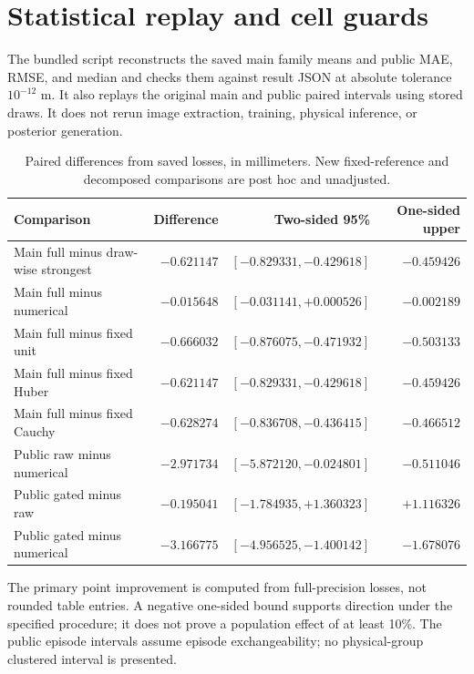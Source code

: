 \documentclass[11pt]{article}
\begin{document}
\section{Statistical replay and cell guards}
The bundled script reconstructs the saved main family means and public MAE, RMSE, and median and checks them against result JSON at absolute tolerance $10^{-12}$ m. It also replays the original main and public paired intervals using stored draws. It does not rerun image extraction, training, physical inference, or posterior generation.
\begin{table}[h]\centering\small
\caption{Paired differences from saved losses, in millimeters. New fixed-reference and decomposed comparisons are post hoc and unadjusted.}
\begin{tabular}{lrrr}\toprule Comparison & Difference & Two-sided 95\% & One-sided upper\\\midrule
Main full minus draw-wise strongest & $-0.621147$ & $[-0.829331,-0.429618]$ & $-0.459426$\\
Main full minus numerical & $-0.015648$ & $[-0.031141,+0.000526]$ & $-0.002189$\\
Main full minus fixed unit & $-0.666032$ & $[-0.876075,-0.471932]$ & $-0.503133$\\
Main full minus fixed Huber & $-0.621147$ & $[-0.829331,-0.429618]$ & $-0.459426$\\
Main full minus fixed Cauchy & $-0.628274$ & $[-0.836708,-0.436415]$ & $-0.466512$\\
Public raw minus numerical & $-2.971734$ & $[-5.872120,-0.024801]$ & $-0.511046$\\
Public gated minus raw & $-0.195041$ & $[-1.784935,+1.360323]$ & $+1.116326$\\
Public gated minus numerical & $-3.166775$ & $[-4.956525,-1.400142]$ & $-1.678076$\\\bottomrule
\end{tabular}\end{table}

The primary point improvement is computed from full-precision losses, not rounded table entries. A negative one-sided bound supports direction under the specified procedure; it does not prove a population effect of at least 10\%. The public episode intervals assume episode exchangeability; no physical-group clustered interval is presented.
\end{document}
